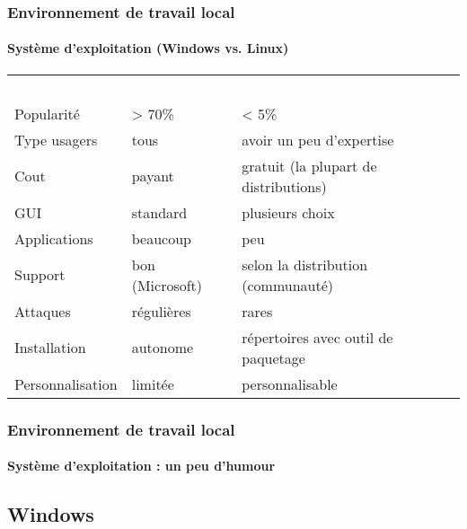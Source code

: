 \documentclass[xcolor=table]{beamer}
\begin{document}
\begin{frame}
\frametitle{Environnement de travail local}
\framesubtitle{Système d'exploitation (Windows vs. Linux)}

	
\begin{tabular}{p{}p{}p{}}
	\rowcolor{darkblue}
	& \textcolor{white}{Windows} & \textcolor{white}{Linux} \\
	
	Popularité & > 70\% & < 5\% \\
	
	Type usagers & tous & avoir un peu d'expertise \\
	
	Cout & payant & gratuit (la plupart de distributions) \\
	
	GUI & standard & plusieurs choix \\
	
	Applications & beaucoup & peu\\
	
	Support & bon (Microsoft) & selon la distribution (communauté) \\
	
	Attaques & régulières & rares\\
	
	Installation & autonome & répertoires avec outil de paquetage \\
	
	Personnalisation & limitée & personnalisable \\
\end{tabular}

\end{frame}


\begin{frame}
\frametitle{Environnement de travail local}
\framesubtitle{Système d'exploitation : un peu d'humour}

\begin{center}
\end{center}

\end{frame}

\subsection{Windows}
\end{document}

